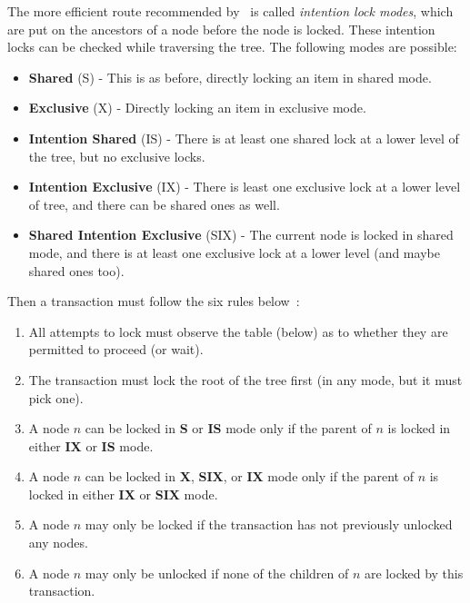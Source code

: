 The more efficient route recommended by~\cite{dsc} is called \textit{intention lock modes}, which are put on the ancestors of a node before the node is locked. These intention locks can be checked while traversing the tree. The following modes are possible:

\begin{itemize}
	\item \textbf{Shared} (S) - This is as before, directly locking an item in shared mode.
	\item \textbf{Exclusive} (X) - Directly locking an item in exclusive mode.
	\item \textbf{Intention Shared} (IS) - There is at least one shared lock at a lower level of the tree, but no exclusive locks.
	\item \textbf{Intention Exclusive} (IX) - There is least one exclusive lock at a lower level of tree, and there can be shared ones as well.
	\item \textbf{Shared Intention Exclusive} (SIX) - The current node is locked in shared mode, and there is at least one exclusive lock at a lower level (and maybe shared ones too).
\end{itemize} 

Then a transaction must follow the six rules below~\cite{dsc}:

\begin{enumerate}
	\item All attempts to lock must observe the table (below) as to whether they are permitted to proceed (or wait).
	\item The transaction must lock the root of the tree first (in any mode, but it must pick one).
	\item A node $n$ can be locked in \textbf{S} or \textbf{IS} mode only if the parent of $n$ is locked in either \textbf{IX} or \textbf{IS} mode.
	\item A node $n$ can be locked in \textbf{X}, \textbf{SIX}, or \textbf{IX} mode only if the parent of $n$ is locked in either \textbf{IX} or \textbf{SIX} mode.
	\item A node $n$ may only be locked if the transaction has not previously unlocked any nodes.
	\item A node $n$ may only be unlocked if none of the children of $n$ are locked by this transaction.
\end{enumerate}

